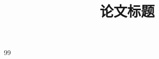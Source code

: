 \documentclass[withoutpreface,bwprint]{cumcmthesis}
\title{论文标题}
\begin{document}
\maketitle

\begin{abstract}

\end{abstract}











\begin{thebibliography}{99}
\end{thebibliography}

\begin{appendices}

\end{appendices}
\end{document}
